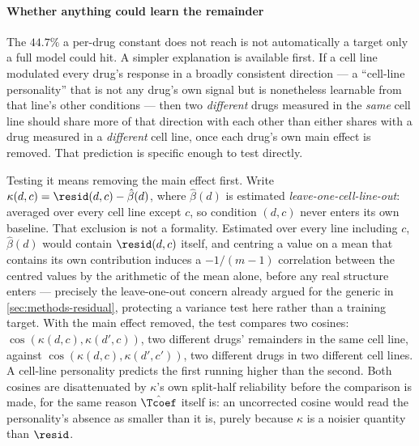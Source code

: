  
\paragraph{Whether anything could learn the remainder} The $44.7\%$ a per-drug
constant does not reach is not automatically a target only a full model could
hit. A simpler explanation is available first. If a cell line modulated every
drug's response in a broadly consistent direction --- a ``cell-line
personality'' that is not any drug's own signal but is nonetheless learnable
from that line's other conditions --- then two \emph{different} drugs measured
in the \emph{same} cell line should share more of that direction with each
other than either shares with a drug measured in a \emph{different} cell line,
once each drug's own main effect is removed. That prediction is specific enough
to test directly.

Testing it means removing the main effect first. Write
$\kappa(d,c) = \resid(d,c) - \hat{\beta}(d)$, where $\hat\beta(d)$ is estimated
\emph{leave-one-cell-line-out}: averaged over every cell line except $c$, so
condition $(d,c)$ never enters its own baseline. That exclusion is not a
formality. Estimated over every line including $c$, $\hat\beta(d)$ would
contain $\resid(d,c)$ itself, and centring a value on a mean that contains its
own contribution induces a $-1/(m-1)$ correlation between the centred values by
the arithmetic of the mean alone, before any real structure enters ---
precisely the leave-one-out concern already argued for the generic in
\cref{sec:methods-residual}, protecting a variance test here rather than a
training target. With the main effect removed, the test compares two cosines:
$\cos(\kappa(d,c), \kappa(d',c))$, two different drugs' remainders in the same
cell line, against $\cos(\kappa(d,c), \kappa(d',c'))$, two different drugs in
two different cell lines. A cell-line personality predicts the first running
higher than the second. Both cosines are disattenuated by $\kappa$'s own
split-half reliability before the comparison is made, for the same reason
$\hat{\Tcoef}$ itself is: an uncorrected cosine would read the personality's
absence as smaller than it is, purely because $\kappa$ is a noisier quantity
than $\resid$.

